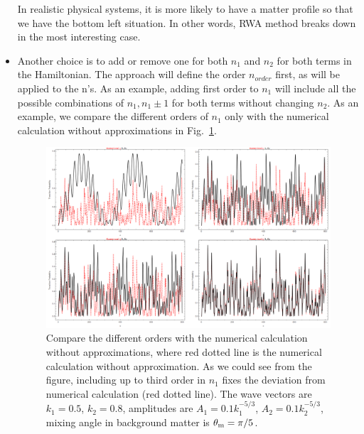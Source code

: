 \begin{itemize}
   In realistic physical systems, it is more likely to have a matter profile so that we have the bottom left situation. In other words, RWA method breaks down in the most interesting case.

\item Another choice is to add or remove one for both $n_1$ and $n_2$ for both terms in the Hamiltonian. The approach will define the order $n_{order}$ first, as will be applied to the n's. As an example, adding first order to $n_1$ will include all the possible combinations of $n_1,n_1\pm 1$ for both terms without changing $n_2$. As an example, we compare the different orders of $n_1$ only with the numerical calculation without approximations in Fig.~\ref{chap:matter-sec:jacobi-subsec:multi-matter-freq-fig:stimulated-2-freq-higher-orders-approach-2}.


\begin{figure}[!htbp]
    \centering
    \includegraphics[width=\textwidth]{chapters/assets/rabi/stimulated-2-freq-higher-orders-approach-2.png}
    \caption{Compare the different orders with the numerical calculation without approximations, where red dotted line is the numerical calculation without approximation. As we could see from the figure, including up to third order in $n_1$ fixes the deviation from numerical calculation (red dotted line). The wave vectors are $k_1=0.5$, $k_2=0.8$, amplitudes are $A_1=0.1 k_1^{-5/3}$, $A_2=0.1 k_2^{-5/3}$, mixing angle in background matter is $\theta_\mathrm m=\pi/5$.}
    \label{chap:matter-sec:jacobi-subsec:multi-matter-freq-fig:stimulated-2-freq-higher-orders-approach-2}
\end{figure}





\end{itemize}
